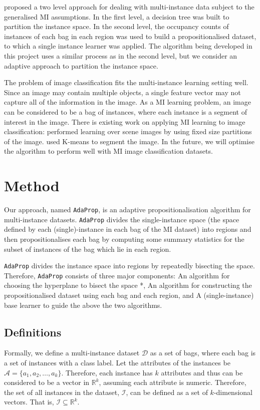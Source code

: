 \documentclass[a4paper,12pt]{article} %
\newcommand{\AdaProp}{\texttt{AdaProp}\xspace}
\newcommand{\real}{\mathbb{R}}
\newcommand{\mcl}[1]{\mathcal{#1}}
\begin{document}
 proposed a two level approach for dealing with multi-instance data 
    subject to the generalised MI assumptions. 
In the first level, 
    a decision tree was built to partition the instance space. 
In the second level, 
    the occupancy counts of instances of each bag in each region 
    was used to build a propositionalised dataset, 
    to which a single instance learner was applied.
The algorithm being developed in this project uses a similar process 
    as  in the second level, 
    but we consider an adaptive approach to partition the instance space.

The problem of image classification fits the multi-instance learning setting well. 
Since an image may contain multiple objects, 
    a single feature vector may not capture all 
    of the information in the image. 
As a MI learning problem, 
    an image can be considered to be a bag of instances, 
    where each instance is a segment of interest in the image. 
There is existing work on applying MI learning to image classification: 
     performed learning over scene images by 
        using fixed size partitions of the image. 
     used K-means to segment the image. 
In the future, 
    we will optimise the algorithm to perform well 
    with MI image classification datasets.


\section{Method}

Our approach, named \AdaProp, is an adaptive propositionalisation algorithm 
    for multi-instance datasets.
\AdaProp divides the single-instance space
    (the space defined by each (single)-instance in each bag of the MI dataset)
    into regions and then
    propositionalises each bag by computing some summary statistics for the 
    subset of instances of the bag which lie in each region.

\AdaProp divides the instance space into regions
    by repeatedly bisecting the space.
Therefore, \AdaProp consists of three major components: 
    An algorithm for choosing the hyperplane to bisect the space *,
    An algorithm for constructing the propositionalised dataset 
        using each bag and each region, and
    A (single-instance) base learner to guide the above the two algorithms.

\subsection{Definitions}
Formally, we define a multi-instance dataset $\mcl{D}$ as a set of bags, 
    where each bag is a set of instances with a class label.
Let the attributes of the instances be  
    $\mcl{A} = \{ a_1,a_2,\ldots,a_k \}$.
Therefore, each instance has $k$ attributes and
    thus can be considered to be a vector in $\real^k$,
    assuming each attribute is numeric.
Therefore, the set of all instances in the dataset, $\mcl{I}$,
    can be defined as a set of $k$-dimensional vectors.
That is, $ \mcl{I} \subseteq \real^k $.
\end{document}
